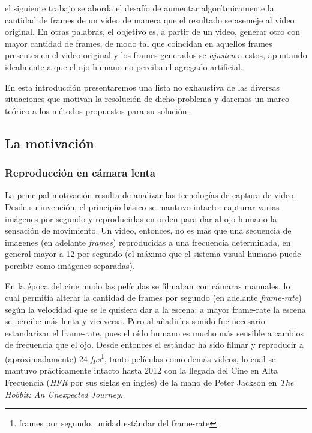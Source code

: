  el siguiente trabajo se aborda el desafío de aumentar algorítmicamente la cantidad de frames de un video de manera que el resultado se asemeje al video original. En otras palabras, el objetivo es, a partir de un video, generar otro con mayor cantidad de frames, de modo tal que coincidan en aquellos frames presentes en el video original y los frames generados se \emph{ajusten} a estos, apuntando idealmente a que el ojo humano no perciba el agregado artificial.

En esta introducción presentaremos una lista no exhaustiva de las diversas situaciones que motivan la resolución de dicho problema y daremos un marco teórico a los métodos propuestos para su solución.

\subsection{La motivación}
\subsubsection{Reproducción en cámara lenta}
La principal motivación resulta de analizar las tecnologías de captura de video. Desde su invención, el principio básico se mantuvo intacto: capturar varias imágenes por segundo y reproducirlas en orden para dar al ojo humano la sensación de movimiento. Un video, entonces, no es más que una secuencia de imagenes (en adelante \emph{frames}) reproducidas a una frecuencia determinada, en general mayor a 12 por segundo (el máximo que el sistema visual humano puede percibir como imágenes separadas\cite{wiki_framerate}).

En la época del cine mudo las películas se filmaban con cámaras manuales, lo cual permitía alterar la cantidad de frames por segundo (en adelante \emph{frame-rate}) según la velocidad que se le quisiera dar a la escena: a mayor frame-rate la escena se percibe más lenta y viceversa. Pero al añadirles sonido fue necesario estandarizar el frame-rate, pues el oído humano es mucho más sensible a cambios de frecuencia que el ojo\cite{wiki_framerate}. Desde entonces el estándar ha sido 
filmar y reproducir a (aproximadamente) 24 \emph{fps}\footnote{frames por segundo, unidad estándar del frame-rate}, tanto películas como demás videos, lo cual se mantuvo prácticamente intacto hasta 2012 con la llegada del Cine en Alta Frecuencia (\emph{HFR} por sus siglas en inglés) de la mano de Peter Jackson en \emph{The Hobbit: An Unexpected Journey}.

